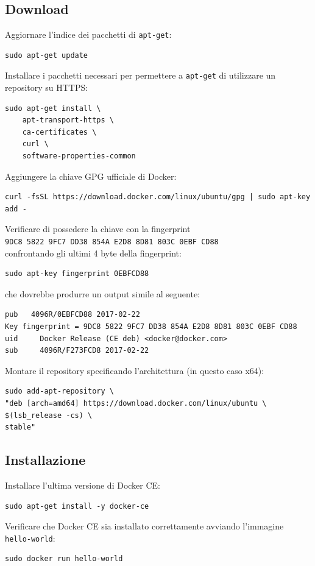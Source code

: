 \subsection{Download}
Aggiornare l'indice dei pacchetti di \verb|apt-get|:
\begin{lstlisting}
sudo apt-get update
\end{lstlisting}
Installare i pacchetti necessari per permettere a \verb|apt-get| di utilizzare un repository su HTTPS:
\begin{lstlisting}
sudo apt-get install \ 
    apt-transport-https \
    ca-certificates \
    curl \
    software-properties-common
\end{lstlisting}
Aggiungere la chiave GPG ufficiale di Docker:
\begin{lstlisting}
curl -fsSL https://download.docker.com/linux/ubuntu/gpg | sudo apt-key add -
\end{lstlisting}
Verificare di possedere la chiave con la fingerprint\\
\verb|9DC8 5822 9FC7 DD38 854A E2D8 8D81 803C 0EBF CD88|\\
confrontando gli ultimi 4 byte della fingerprint:
\begin{lstlisting}
sudo apt-key fingerprint 0EBFCD88
\end{lstlisting}
che dovrebbe produrre un output simile al seguente:
\begin{lstlisting}
pub   4096R/0EBFCD88 2017-02-22
Key fingerprint = 9DC8 5822 9FC7 DD38 854A E2D8 8D81 803C 0EBF CD88
uid     Docker Release (CE deb) <docker@docker.com>
sub     4096R/F273FCD8 2017-02-22
\end{lstlisting}
Montare il repository specificando l'architettura (in questo caso x64):
\begin{lstlisting}
sudo add-apt-repository \
"deb [arch=amd64] https://download.docker.com/linux/ubuntu \
$(lsb_release -cs) \
stable"
\end{lstlisting}

\subsection{Installazione}
Installare l'ultima versione di Docker CE:
\begin{lstlisting}
sudo apt-get install -y docker-ce
\end{lstlisting}
Verificare che Docker CE sia installato correttamente avviando l'immagine \verb|hello-world|:
\begin{lstlisting}
sudo docker run hello-world
\end{lstlisting}



